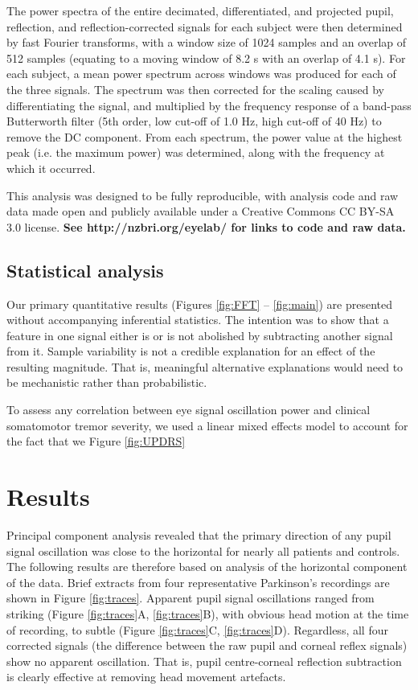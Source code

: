 \documentclass[jou,a4paper]{apa6}
\begin{document}
The power spectra of the entire decimated, differentiated, and projected pupil, reflection, and reflection-corrected signals for each subject were then determined by fast Fourier transforms, with a window size of 1024 samples and an overlap of 512 samples (equating to a moving window of 8.2 s with an overlap of 4.1 s). For each subject, a mean power spectrum across windows was produced for each of the three signals. The spectrum was then corrected for the scaling caused by differentiating the signal, and multiplied by the frequency response of a band-pass Butterworth filter (5th order, low cut-off of 1.0 Hz, high cut-off of 40 Hz) to remove the DC component. From each spectrum, the power value at the highest peak (i.e. the maximum power) was determined, along with the frequency at which it occurred.

This analysis was designed to be fully reproducible, with analysis code and raw data made open and publicly available under a Creative Commons CC BY-SA 3.0 license. \textbf{See http://nzbri.org/eyelab/ for links to code and raw data.}

\subsection{Statistical analysis}
Our primary quantitative results (Figures \ref{fig:FFT} -- \ref{fig:main}) are presented without accompanying inferential statistics. The intention was to show that a feature in one signal either is or is not abolished by subtracting another signal from it. Sample variability is not a credible explanation for an effect of the resulting magnitude. That is, meaningful alternative explanations would need to be mechanistic rather than probabilistic.

To assess any correlation between eye signal oscillation power and clinical somatomotor tremor severity, we used a linear mixed effects model to account for the fact that we  Figure \ref{fig:UPDRS}

\section{Results}
Principal component analysis revealed that the primary direction of any pupil signal oscillation was close to the horizontal for nearly all patients and controls. The following results are therefore based on analysis of the horizontal component of the data. Brief extracts from four representative Parkinson's recordings are shown in Figure \ref{fig:traces}. Apparent pupil signal oscillations ranged from striking (Figure \ref{fig:traces}A, \ref{fig:traces}B), with obvious head motion at the time of recording, to subtle (Figure \ref{fig:traces}C, \ref{fig:traces}D). Regardless, all four corrected signals (the difference between the raw pupil and corneal reflex signals) show no apparent oscillation. That is, pupil centre-corneal reflection subtraction is clearly effective at removing head movement artefacts.
\end{document}
